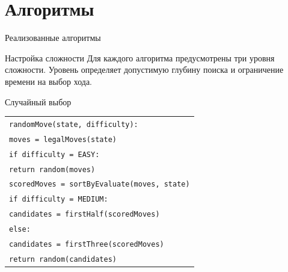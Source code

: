 \documentclass[fullscreen=true,russian,compress,%
    hyperref={unicode,bookmarks=false}]{presentation}
\begin{document}
\section{Алгоритмы}

\begin{frame}{Реализованные алгоритмы}
\centering
{}

\vspace{.25cm}
\begin{block}{Настройка сложности}
\small
Для каждого алгоритма предусмотрены три уровня сложности. Уровень определяет допустимую глубину поиска и ограничение времени на выбор хода.
\end{block}
\end{frame}

\begin{frame}{Случайный выбор}
\begin{block}{}
\scriptsize
\begin{tabular}{@{}l@{}}
\texttt{randomMove(state, difficulty):} \\
\quad \texttt{moves = legalMoves(state)} \\
\quad \texttt{if difficulty = EASY:} \\
\quad\quad \texttt{return random(moves)} \\
\quad \texttt{scoredMoves = sortByEvaluate(moves, state)} \\
\quad \texttt{if difficulty = MEDIUM:} \\
\quad\quad \texttt{candidates = firstHalf(scoredMoves)} \\
\quad \texttt{else:} \\
\quad\quad \texttt{candidates = firstThree(scoredMoves)} \\
\quad \texttt{return random(candidates)}
\end{tabular}
\end{block}
\end{frame}
\end{document}
